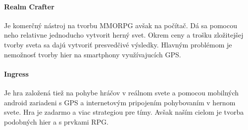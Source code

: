 \paragraph{Realm Crafter} Je komerčný nástroj na tvorbu MMORPG avšak na počítač. Dá sa pomocou neho relativne jednoducho vytvorit herný svet. Okrem ceny a trošku zložitejšej tvorby sveta sa dajú vytvoriť presvedčivé výsledky. Hlavným problémom je nemožnosť tvorby hier na smartphony využívajucích GPS.

\paragraph{Ingress} Je hra založená tiež na pohybe hráčov v reálnom svete a pomocou mobilných android zariadeni s GPS a internetovým pripojením pohybovaním v hernom svete. Hra je zadarmo a viac strategiou pre tímy. Avšak naším cielom je tvorba podobných hier a s prvkami RPG.

